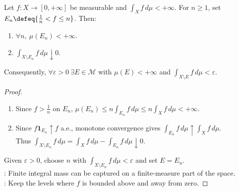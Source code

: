 \begin{proposition} \label{prop:finite-positive-integral-localization} \\
Let $f:X\to[0,+\infty]$ be measurable and $\int_X f\,d\mu<+\infty$. For $n\geq1$, set $E_n\defeq\{\frac{1}{n}<f\leq n\}$. Then:
\begin{enumerate}[label=(\roman*)]
\setlength{\itemsep}{0pt}
\item $\forall n,\ \mu(E_n)<+\infty$.
\item $\int_{X\setminus E_n}f\,d\mu\downarrow0$.
\end{enumerate}
Consequently, $\forall\varepsilon>0\ \exists E\in\mathcal{M}$ with $\mu(E)<+\infty$ and $\int_{X\setminus E}f\,d\mu<\varepsilon$.
\begin{proof}
\begin{enumerate}[label=(\roman*)]
\setlength{\itemsep}{0pt}
\item Since $f>\frac{1}{n}$ on $E_n$, $\mu(E_n)\leq n\int_{E_n}f\,d\mu\leq n\int_Xf\,d\mu<+\infty$.
\item Since $f\mathbf{1}_{E_n}\uparrow f$ a.e., monotone convergence gives $\int_{E_n}f\,d\mu\uparrow\int_Xf\,d\mu$.\\
Thus $\int_{X\setminus E_n}f\,d\mu=\int_Xf\,d\mu-\int_{E_n}f\,d\mu\downarrow0$.
\end{enumerate}
Given $\varepsilon>0$, choose $n$ with $\int_{X\setminus E_n}f\,d\mu<\varepsilon$ and set $E=E_n$.\\
: Finite integral mass can be captured on a finite-measure part of the space.\\
: Keep the levels where $f$ is bounded above and away from zero.
\end{proof}
\end{proposition}

